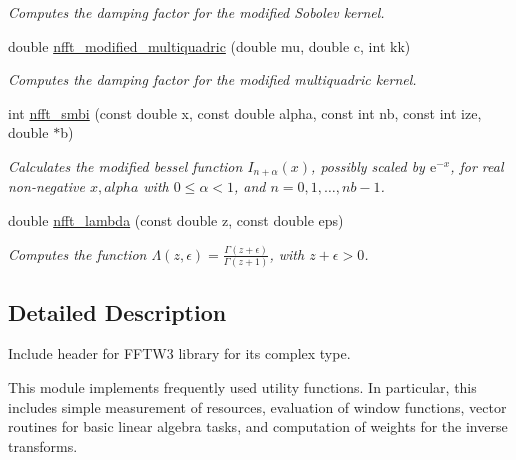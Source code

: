 \begin{CompactItemize}
\begin{CompactList}\small\item\em Computes the damping factor for the modified Sobolev kernel. \item\end{CompactList}\item 
\hypertarget{group__nfftutil_gc6201bc2aa806bd25cb14c5f96d644e9}{
double \hyperlink{group__nfftutil_gc6201bc2aa806bd25cb14c5f96d644e9}{nfft\_\-modified\_\-multiquadric} (double mu, double c, int kk)}
\label{group__nfftutil_gc6201bc2aa806bd25cb14c5f96d644e9}

\begin{CompactList}\small\item\em Computes the damping factor for the modified multiquadric kernel. \item\end{CompactList}\item 
int \hyperlink{group__nfftutil_g2decee6fe50d50797a82737ba82cf97a}{nfft\_\-smbi} (const double x, const double alpha, const int nb, const int ize, double $\ast$b)
\begin{CompactList}\small\item\em Calculates the modified bessel function $I_{n+\alpha}(x)$, possibly scaled by $\mathrm{e}^{-x}$, for real non-negative $x,alpha$ with $0 \le \alpha < 1$, and $n=0,1,\ldots,nb-1$. \item\end{CompactList}\item 
double \hyperlink{group__nfftutil_g8b29244516d573dca1d0fe134a97b9a6}{nfft\_\-lambda} (const double z, const double eps)
\begin{CompactList}\small\item\em Computes the function $\Lambda(z,\epsilon) = \frac{\Gamma(z+\epsilon)}{\Gamma(z+1)}$, with $ z + \epsilon > 0$. \item\end{CompactList}\end{CompactItemize}


\subsection{Detailed Description}
Include header for FFTW3 library for its complex type. 

This module implements frequently used utility functions. In particular, this includes simple measurement of resources, evaluation of window functions, vector routines for basic linear algebra tasks, and computation of weights for the inverse transforms. 

